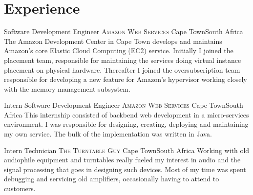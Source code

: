 \documentclass[11pt,a4paper,sans]{moderncv}
\begin{document}


\section{Experience}

{Software Development Engineer}
{\textsc{Amazon Web Services}}
{\newline Cape Town}{South Africa}
{The Amazon Development Center in Cape Town develops and maintains Amazon's
core Elastic Cloud Computing (EC2) service. Initially I joined the placement
team, responsible for maintaining the services doing virtual instance placement
on physical hardware. Thereafter I joined the oversubscription team responsible
for developing a new feature for Amazon's hypervisor working closely with the
memory management subsystem.}

{Intern Software Development Engineer}
{\textsc{Amazon Web Services}}
{\newline Cape Town}{South Africa}
{This internship consisted of backbend web development in a micro-services
environment. I was responsible for designing, creating, deploying and maintaining
my own service. The bulk of the implementation was written in Java.}

{Intern Technician}
{\textsc{The Turntable Guy}}
{\newline Cape Town}{South Africa}
{Working with old audiophile equipment and turntables really fueled my interest in
audio and the signal processing that goes in designing such devices. Most of my
time was spent debugging and servicing old amplifiers, occasionally having to
attend to customers.}
\end{document}
